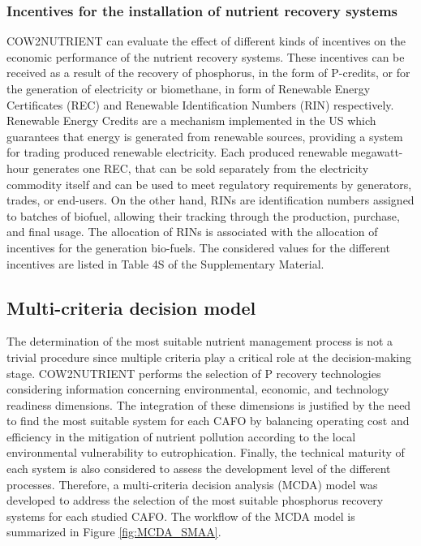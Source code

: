 \begin{refsection}[referencesCh4]
\subsubsection{Incentives for the installation of nutrient recovery systems}
COW2NUTRIENT can evaluate the effect of different kinds of incentives on the economic performance of the nutrient recovery systems. These incentives can be received as a result of the recovery of phosphorus, in the form of P-credits, or for the generation of electricity or biomethane, in form of Renewable Energy Certificates (REC) and Renewable Identification Numbers (RIN) respectively. Renewable Energy Credits are a mechanism implemented in the US which guarantees that energy is generated from renewable sources, providing a system for trading produced renewable electricity. Each produced renewable megawatt-hour generates one REC, that can be sold separately from the electricity commodity itself and can be used to meet regulatory requirements by generators, trades, or end-users. On the other hand, RINs are identification numbers assigned to batches of biofuel, allowing their tracking through the production, purchase, and final usage. The allocation of RINs is associated with the allocation of incentives for the generation bio-fuels. 
The considered values for the different incentives are listed in Table 4S of the Supplementary Material.

\subsection{Multi-criteria decision model}
The determination of the most suitable nutrient management process is not a trivial procedure since multiple criteria play a critical role at the decision-making stage. COW2NUTRIENT performs the selection of P recovery technologies considering information concerning environmental, economic, and technology readiness dimensions. The integration of these dimensions is justified by the need to find the most suitable system for each CAFO by balancing operating cost and efficiency in the mitigation of nutrient pollution according to the local environmental vulnerability to eutrophication. Finally, the technical maturity of each system is also considered to assess the development level of the different processes. Therefore, a multi-criteria decision analysis (MCDA) model was developed to address the selection of the most suitable phosphorus recovery systems for each studied CAFO. The workflow of the MCDA model is summarized in Figure \ref{fig:MCDA_SMAA}.


\end{refsection}
